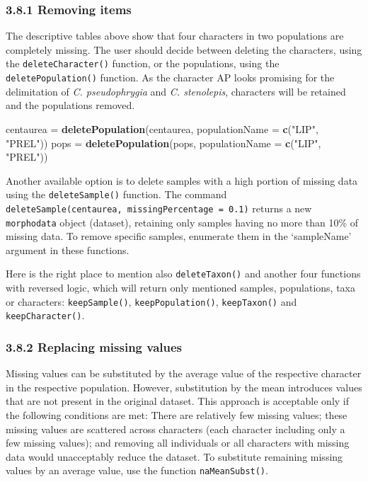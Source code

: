 \documentclass[
]{article}
\newenvironment{Shaded}{\begin{snugshade}}{\end{snugshade}}
\newcommand{\DataTypeTok}[1]{\textcolor[rgb]{0.13,0.29,0.53}{#1}}
\newcommand{\KeywordTok}[1]{\textcolor[rgb]{0.13,0.29,0.53}{\textbf{#1}}}
\newcommand{\NormalTok}[1]{#1}
\newcommand{\StringTok}[1]{\textcolor[rgb]{0.31,0.60,0.02}{#1}}
\begin{document}
\hypertarget{removing-items}{%
\subsubsection{3.8.1 Removing items}\label{removing-items}}

The descriptive tables above show that four characters in two
populations are completely missing. The user should decide between
deleting the characters, using the \texttt{deleteCharacter()} function,
or the populations, using the \texttt{deletePopulation()} function. As
the character AP looks promising for the delimitation of \emph{C.
pseudophrygia} and \emph{C. stenolepis}, characters will be retained and
the populations removed.

\begin{Shaded}
\begin{Highlighting}[]
\NormalTok{centaurea =}\StringTok{ }\KeywordTok{deletePopulation}\NormalTok{(centaurea, }\DataTypeTok{populationName =} \KeywordTok{c}\NormalTok{(}\StringTok{"LIP"}\NormalTok{, }\StringTok{"PREL"}\NormalTok{))}
\NormalTok{pops =}\StringTok{ }\KeywordTok{deletePopulation}\NormalTok{(pops, }\DataTypeTok{populationName =} \KeywordTok{c}\NormalTok{(}\StringTok{"LIP"}\NormalTok{, }\StringTok{"PREL"}\NormalTok{))}
\end{Highlighting}
\end{Shaded}

Another available option is to delete samples with a high portion of
missing data using the \texttt{deleteSample()} function. The command
\texttt{deleteSample(centaurea,\ missingPercentage\ =\ 0.1)} returns a
new \texttt{morphodata} object (dataset), retaining only samples having
no more than 10\% of missing data. To remove specific samples, enumerate
them in the `sampleName' argument in these functions.

Here is the right place to mention also \texttt{deleteTaxon()} and
another four functions with reversed logic, which will return only
mentioned samples, populations, taxa or characters:
\texttt{keepSample()}, \texttt{keepPopulation()}, \texttt{keepTaxon()}
and \texttt{keepCharacter()}.

\hypertarget{replacing-missing-values}{%
\subsubsection{3.8.2 Replacing missing
values}\label{replacing-missing-values}}

Missing values can be substituted by the average value of the respective
character in the respective population. However, substitution by the
mean introduces values that are not present in the original dataset.
This approach is acceptable only if the following conditions are met:
There are relatively few missing values; these missing values are
scattered across characters (each character including only a few missing
values); and removing all individuals or all characters with missing
data would unacceptably reduce the dataset. To substitute remaining
missing values by an average value, use the function
\texttt{naMeanSubst()}.
\end{document}
